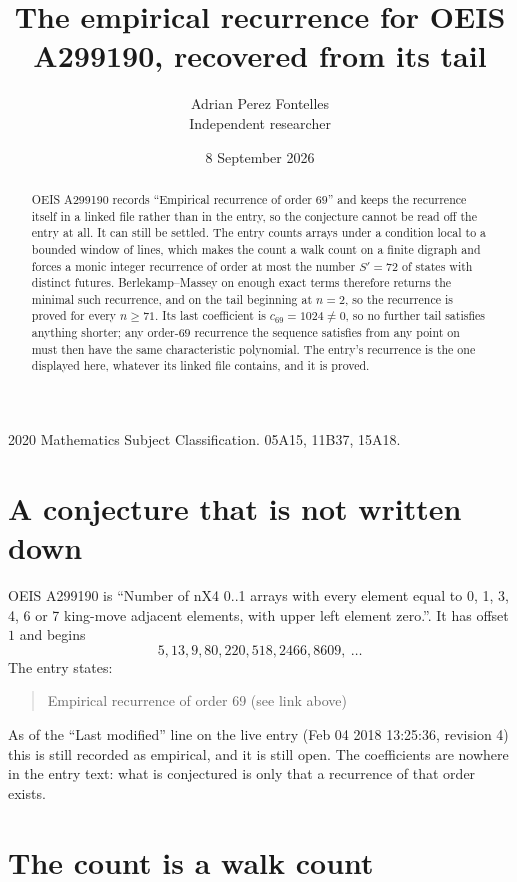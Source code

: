 \documentclass[11pt,a4paper]{article}
\title{The empirical recurrence for OEIS A299190, recovered from its tail}
\author{Adrian Perez Fontelles\\ \small Independent researcher}
\date{8 September 2026}
\theoremstyle{plain}
\theoremstyle{definition}
\begin{document}
\maketitle

\begin{abstract}
OEIS A299190 records ``Empirical recurrence of order $69$'' and keeps the recurrence itself in
a linked file rather than in the entry, so the conjecture cannot be read off the entry at all.
It can still be settled. The entry counts arrays under a condition local to a bounded window of
lines, which makes the count a walk count on a finite digraph and forces a monic integer
recurrence of order at most the number $S'=72$ of states with distinct futures. Berlekamp--Massey on
enough exact terms therefore returns the minimal such recurrence, and on the tail beginning at $n=2$, so the recurrence is proved for every $n\ge71$.
Its last coefficient is $c_{69}=1024\neq0$, so no further tail satisfies anything
shorter; any order-$69$ recurrence the sequence satisfies from any point on must then have
the same characteristic polynomial. The entry's recurrence is the one displayed here, whatever
its linked file contains, and it is proved.
\end{abstract}

\noindent\small 2020 Mathematics Subject Classification. 05A15, 11B37, 15A18.\normalsize

\section{A conjecture that is not written down}

OEIS A299190 is ``Number of nX4 0..1 arrays with every element equal to 0, 1, 3, 4, 6 or 7 king-move adjacent elements, with upper left element zero.''. It has offset $1$ and begins
\[
5, 13, 9, 80, 220, 518, 2466, 8609,\ \dots
\]
The entry states:
\begin{quote}
Empirical recurrence of order 69 (see link above)
\end{quote}
As of the ``Last modified'' line on the live entry (Feb 04 2018 13:25:36, revision 4)
this is still recorded as empirical, and it is still open. The coefficients are nowhere in the
entry text: what is conjectured is only that a recurrence of that order exists.

\section{The count is a walk count}
\end{document}
